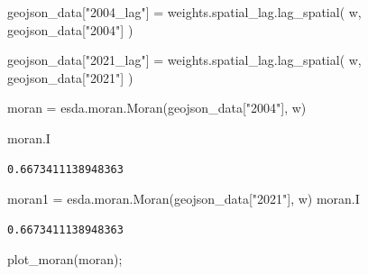\documentclass[
  letterpaper,
  DIV=11,
  numbers=noendperiod]{scrreprt}
\newenvironment{Shaded}{\begin{snugshade}}{\end{snugshade}}
\newcommand{\NormalTok}[1]{\textcolor[rgb]{0.00,0.23,0.31}{#1}}
\newcommand{\OperatorTok}[1]{\textcolor[rgb]{0.37,0.37,0.37}{#1}}
\newcommand{\StringTok}[1]{\textcolor[rgb]{0.13,0.47,0.30}{#1}}
\begin{document}
\begin{Shaded}
\begin{Highlighting}[]
\NormalTok{geojson\_data[}\StringTok{"2004\_lag"}\NormalTok{] }\OperatorTok{=}\NormalTok{ weights.spatial\_lag.lag\_spatial(}
\NormalTok{    w, geojson\_data[}\StringTok{"2004"}\NormalTok{]}
\NormalTok{)}
\end{Highlighting}
\end{Shaded}

\begin{Shaded}
\begin{Highlighting}[]
\NormalTok{geojson\_data[}\StringTok{"2021\_lag"}\NormalTok{] }\OperatorTok{=}\NormalTok{ weights.spatial\_lag.lag\_spatial(}
\NormalTok{    w, geojson\_data[}\StringTok{"2021"}\NormalTok{]}
\NormalTok{)}
\end{Highlighting}
\end{Shaded}

\begin{Shaded}
\begin{Highlighting}[]

\NormalTok{moran }\OperatorTok{=}\NormalTok{ esda.moran.Moran(geojson\_data[}\StringTok{"2004"}\NormalTok{], w)}
\end{Highlighting}
\end{Shaded}

\begin{Shaded}
\begin{Highlighting}[]
\NormalTok{moran.I}
\end{Highlighting}
\end{Shaded}

\begin{verbatim}
0.6673411138948363
\end{verbatim}

\begin{Shaded}
\begin{Highlighting}[]
\NormalTok{moran1 }\OperatorTok{=}\NormalTok{ esda.moran.Moran(geojson\_data[}\StringTok{"2021"}\NormalTok{], w)}
\NormalTok{moran.I}
\end{Highlighting}
\end{Shaded}

\begin{verbatim}
0.6673411138948363
\end{verbatim}

\begin{Shaded}
\begin{Highlighting}[]
\NormalTok{plot\_moran(moran)}\OperatorTok{;}
\end{Highlighting}
\end{Shaded}
\end{document}
